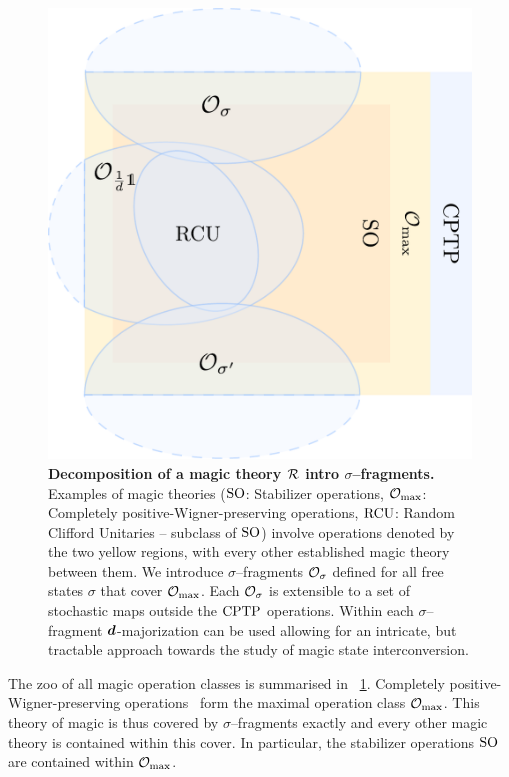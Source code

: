 \documentclass[pra,
aps,
twocolumn,
superscriptaddress,
groupedaddress,
nofootinbib,
reprint
]{revtex4-1}
\begin{document}
\begin{figure}[t]
    \centering
        \includegraphics[scale=0.3
        ]{figs/operations.pdf}
    \caption{\textbf{Decomposition of a magic theory $\mathcal{R}$ intro $\sigma$--fragments.} 
	Examples of magic theories (${\rm{SO}}$: Stabilizer operations, $\mathcal{O}_{\rm{max}}$: Completely positive-Wigner-preserving operations, ${\rm{RCU}}$: Random Clifford Unitaries -- subclass of ${\rm{SO}}$) involve operations denoted by the two yellow regions, with every other established magic theory  between them.
    We introduce $\sigma$--fragments $\mathcal{O}_\sigma$ defined for all free states $\sigma$ that cover $\mathcal{O}_{\rm{max}}$. 
    Each $\mathcal{O}_\sigma$ is extensible to a set of stochastic maps outside the ${\rm{CPTP}}$ operations.
    Within each $\sigma$--fragment $\bm{d}$-majorization can be used allowing for an intricate, but tractable approach towards the study of magic state interconversion.
    }
    \label{fig:zoo}
\end{figure}

The zoo of all magic operation classes is summarised in ~\cref{fig:zoo}.
Completely positive-Wigner-preserving operations~\cite{cit:wang} form the maximal operation class $\mathcal{O}_{\rm{max}}$.
This theory of magic is thus covered by $\sigma$--fragments exactly and every other magic theory is contained within this cover.
In particular, the stabilizer operations ${\rm{SO}}$ are contained within $\mathcal{O}_{\rm{max}}$.
\end{document}
